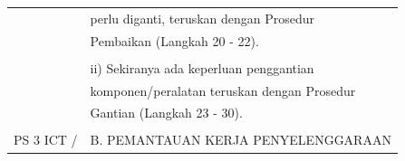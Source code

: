 \documentclass[
]{article}
\begin{document}
\begin{longtable}[]{@{}ll@{}}
\begin{minipage}[t]{0.23\columnwidth}
\strut
\end{minipage} & \begin{minipage}[t]{0.71\columnwidth}\raggedright
perlu diganti, teruskan dengan Prosedur\strut
\end{minipage}\tabularnewline
\begin{minipage}[t]{0.23\columnwidth}\raggedright
\strut
\end{minipage} & \begin{minipage}[t]{0.71\columnwidth}\raggedright
Pembaikan (Langkah 20 - 22).\strut
\end{minipage}\tabularnewline
\begin{minipage}[t]{0.23\columnwidth}\raggedright
\strut
\end{minipage} & \begin{minipage}[t]{0.71\columnwidth}\raggedright
\strut
\end{minipage}\tabularnewline
\begin{minipage}[t]{0.23\columnwidth}\raggedright
\strut
\end{minipage} & \begin{minipage}[t]{0.71\columnwidth}\raggedright
ii) Sekiranya ada keperluan penggantian\strut
\end{minipage}\tabularnewline
\begin{minipage}[t]{0.23\columnwidth}\raggedright
\strut
\end{minipage} & \begin{minipage}[t]{0.71\columnwidth}\raggedright
komponen/peralatan teruskan dengan Prosedur\strut
\end{minipage}\tabularnewline
\begin{minipage}[t]{0.23\columnwidth}\raggedright
\strut
\end{minipage} & \begin{minipage}[t]{0.71\columnwidth}\raggedright
Gantian (Langkah 23 - 30).\strut
\end{minipage}\tabularnewline
\begin{minipage}[t]{0.23\columnwidth}\raggedright
\strut
\end{minipage} & \begin{minipage}[t]{0.71\columnwidth}\raggedright
\strut
\end{minipage}\tabularnewline
\begin{minipage}[t]{0.23\columnwidth}\raggedright
PS 3 ICT /\strut
\end{minipage} & \begin{minipage}[t]{0.71\columnwidth}\raggedright
B. PEMANTAUAN KERJA PENYELENGGARAAN\strut

\end{minipage}
\end{longtable}
\end{document}
